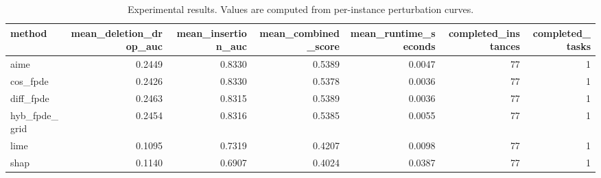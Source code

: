 \begin{table}[t]
\caption{Experimental results. Values are computed from per-instance perturbation curves.}
\label{tab:main_results_computed}
\centering
\begin{tabular}{lrrrrrr}
\toprule
method & mean\_deletion\_drop\_auc & mean\_insertion\_auc & mean\_combined\_score & mean\_runtime\_seconds & completed\_instances & completed\_tasks \\
\midrule
aime & 0.2449 & 0.8330 & 0.5389 & 0.0047 & 77 & 1 \\
cos\_fpde & 0.2426 & 0.8330 & 0.5378 & 0.0036 & 77 & 1 \\
diff\_fpde & 0.2463 & 0.8315 & 0.5389 & 0.0036 & 77 & 1 \\
hyb\_fpde\_grid & 0.2454 & 0.8316 & 0.5385 & 0.0055 & 77 & 1 \\
lime & 0.1095 & 0.7319 & 0.4207 & 0.0098 & 77 & 1 \\
shap & 0.1140 & 0.6907 & 0.4024 & 0.0387 & 77 & 1 \\
\bottomrule
\end{tabular}

\end{table}
